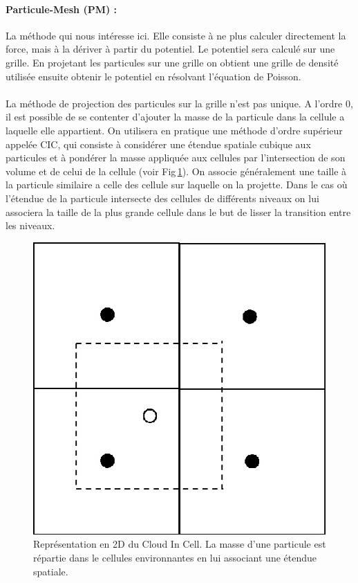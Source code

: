\paragraph{Particule-Mesh (PM) : } La méthode qui nous intéresse ici.
Elle consiste à ne plus calculer directement la force, mais à la dériver à partir du potentiel.
Le potentiel sera calculé sur une grille.
En projetant les particules sur une grille on obtient une grille de densité utilisée ensuite obtenir le potentiel en résolvant l'équation de Poisson.

\paragraph{}
La méthode de projection des particules sur la grille n'est pas unique.
A l'ordre $0$, il est possible de se contenter d'ajouter la masse de la particule dans la cellule a laquelle elle appartient.
On utilisera en pratique une méthode d'ordre supérieur appelée \ac{CIC}, qui consiste à considérer une étendue spatiale cubique aux particules et à pondérer la masse appliquée aux cellules par l'intersection de son volume et de celui de la cellule (voir Fig\,\ref{fig:CIC}).
On associe généralement une taille à la particule similaire a celle des cellule sur laquelle on la projette.
Dans le cas où l’étendue de la particule intersecte des cellules de différents niveaux on lui associera la taille de la plus grande cellule dans le but de lisser la transition entre les niveaux.

\begin{figure}
		\centering
        \includegraphics[width=.5\linewidth]{img/02/CIC.jpg} 
        \caption[CIC]{Représentation en 2D du Cloud In Cell. 
        La masse d'une particule est répartie dans le cellules environnantes en lui associant une étendue spatiale.
 		\label{fig:CIC}}
\end{figure}


